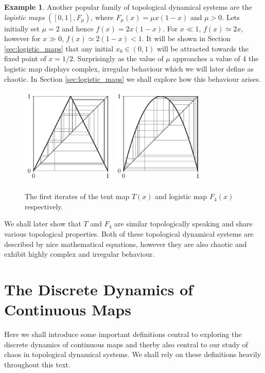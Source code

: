 \documentclass[11pt,a4paper,oneside]{memoir}
\theoremstyle{plain}
\theoremstyle{definition}
\newtheorem{exmp}[thm]{Example}
\begin{document}
\begin{exmp}
    Another popular family of topological dynamical systems are the \emph{logistic maps} $([0, 1], F_{\mu})$, where $F_{\mu}(x)=\mu x(1-x)$ and $\mu > 0$. Lets initially set $\mu = 2$ and hence $f(x) = 2x(1-x)$. For $x \ll 1$, $f(x) \simeq 2x$, however for $x \gg 0$, $f(x) \simeq 2(1-x) < 1$. It will be shown in Section \ref{sec:logistic_maps} that any initial $x_0 \in (0, 1)$ will be attracted towards the fixed point of $x = 1/2$. Surprisingly as the value of $\mu$ approaches a value of $4$ the logistic map displays complex, irregular behaviour which we will later define as chaotic. In Section \ref{sec:logistic_maps} we shall explore how this behaviour arises.
\end{exmp}

\begin{figure}[h]
    \centering
    \includegraphics[width=4.5cm]{tent}
    \includegraphics[width=4.5cm]{logistic_4}
    \caption{The first iterates of the tent map $T(x)$ and logistic map $F_{4}(x)$ respectively.}
    \label{fig:tent-logistic}
\end{figure}

We shall later show that $T$ and $F_4$ are similar topologically speaking and share various topological properties. Both of these topological dynamical systems are described by nice mathematical equations, however they are also chaotic and exhibit highly complex and irregular behaviour.

\section{The Discrete Dynamics of Continuous Maps}
Here we shall introduce some important definitions central to exploring the discrete dynamics of continuous maps and therby also central to our study of chaos in topological dynamical systems. We shall rely on these definitions heavily throughout this text.
\end{document}
